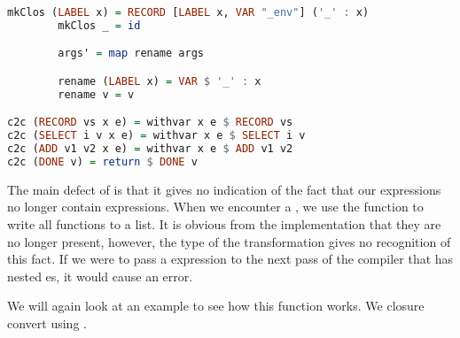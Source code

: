 {\begin{lstlisting}[language=Haskell]
        mkClos (LABEL x) = RECORD [LABEL x, VAR "_env"] ('_' : x)
        mkClos _ = id

        args' = map rename args

        rename (LABEL x) = VAR $ '_' : x
        rename v = v

c2c (RECORD vs x e) = withvar x e $ RECORD vs
c2c (SELECT i v x e) = withvar x e $ SELECT i v
c2c (ADD v1 v2 x e) = withvar x e $ ADD v1 v2
c2c (DONE v) = return $ DONE v
\end{lstlisting}

The main defect of  is that it gives no indication of the fact that our  expressions no longer contain  expressions. When we encounter a , we use the  function to write all functions to a list. It is obvious from the implementation that they are no longer present, however, the type  of the transformation gives no recognition of this fact. If we were to pass a  expression to the next pass of the compiler that has nested es, it would cause an error.

We will again look at an example to see how this function works. We closure convert  using .

}

